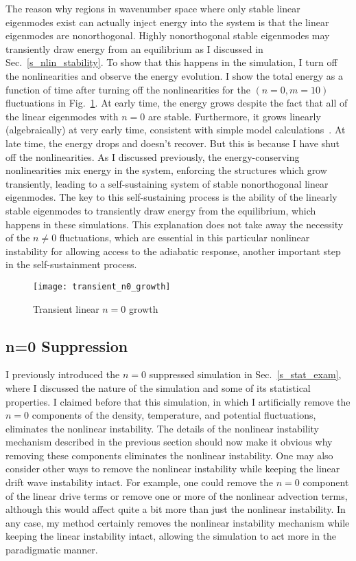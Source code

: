 The reason why regions in wavenumber space where only stable linear eigenmodes exist can actually inject energy into the system is that the 
linear eigenmodes are nonorthogonal. Highly nonorthogonal stable eigenmodes may transiently draw energy from an equilibrium as I discussed in Sec.~\ref{s_nlin_stability}.
To show that this happens in the simulation, I turn off the nonlinearities and observe the energy evolution. I show the total energy as a function of time after turning off the nonlinearities
for the $(n=0,m=10)$ fluctuations in Fig.~\ref{transient_n0_growth}. At early time, the energy grows despite the fact that all of the linear eigenmodes with $n=0$ are stable. Furthermore,
it grows linearly (algebraically) at very early time, consistent with simple model calculations~\cite{waleffe1995}. 
At late time, the energy drops and doesn't recover. But this is because I have shut off the nonlinearities. As I discussed previously, 
the energy-conserving nonlinearities mix energy in the system, enforcing the structures which grow transiently, leading to a self-sustaining system of stable nonorthogonal linear eigenmodes.
The key to this self-sustaining process is the ability of the linearly stable eigenmodes to transiently draw energy from the equilibrium, which happens in these simulations.
This explanation does not take away the necessity of the $n \ne 0$ fluctuations, which are essential in this particular nonlinear instability for allowing access to the adiabatic response,
another important step in the self-sustainment process.

\begin{figure}[!ht]
\centerline{\texttt{[image: transient\_n0\_growth]}}
\caption{Transient linear $n=0$ growth}
\label{transient_n0_growth}
\end{figure}

\subsection{n=0 Suppression}
\label{ss_n0_supp}

I previously introduced the $n=0$ suppressed simulation in Sec.~\ref{s_stat_exam}, where I discussed the nature of the simulation and some of its statistical properties. I claimed before that
this simulation, in which I artificially remove the $n=0$ components of the density, temperature, and potential fluctuations, eliminates the nonlinear instability.
The details of the nonlinear instability mechanism described in the previous section should now make it obvious why removing these components eliminates the nonlinear instability.
One may also consider other ways to remove the nonlinear instability while keeping the linear drift wave instability intact. For example, one could remove the $n=0$ component of the linear
drive terms or remove one or more of the nonlinear advection terms, although this would affect quite a bit more than just the nonlinear instability. In any case, my method
certainly removes the nonlinear instability mechanism while keeping the linear instability intact, allowing the simulation to act more in the paradigmatic manner.

